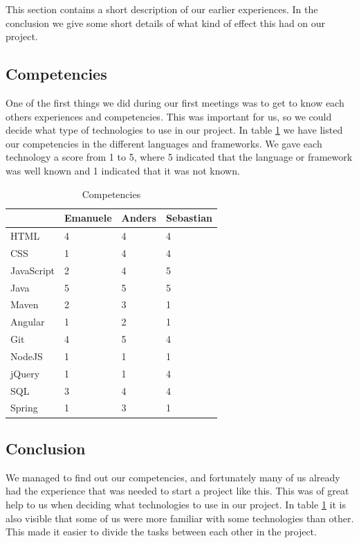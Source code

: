 This section contains a short description of our earlier experiences.
In the conclusion we give some short details of what kind of effect this had on our project.

\subsection{Competencies}

One of the first things we did during our first meetings was to get to know each others experiences and competencies.
This was important for us, so we could decide what type of technologies to use in our project.
In table \ref{table:competencies} we have listed our competencies in the different languages and frameworks.
We gave each technology a score from 1 to 5, where 5 indicated that the language or framework was well known and 1 indicated that it was not known.

\begin{table}
\begin{center}
\begin{tabular}{ l | l | l | l }
  \hline
  & Emanuele & Anders & Sebastian \\ \hline
  HTML & 4 & 4 & 4 \\
  CSS  & 1 & 4 & 4 \\
  JavaScript & 2 & 4 & 5 \\
  Java & 5 & 5 & 5 \\
  Maven & 2 & 3 & 1 \\
  Angular & 1 & 2 & 1 \\
  Git & 4 & 5 & 4 \\
  NodeJS & 1 & 1 & 1 \\
  jQuery & 1 & 1 & 4 \\
  SQL & 3 & 4 & 4 \\
  Spring & 1 & 3 & 1 \\
  \hline
\end{tabular}
\end{center}
\caption{Competencies}
\label{table:competencies}
\end{table}

\subsection{Conclusion}

We managed to find out our competencies, and fortunately many of us already had the experience that was needed to start a project like this.
This was of great help to us when deciding what technologies to use in our project.
In table \ref{table:competencies} it is also visible that some of us were more familiar with some technologies than other.
This made it easier to divide the tasks between each other in the project.

